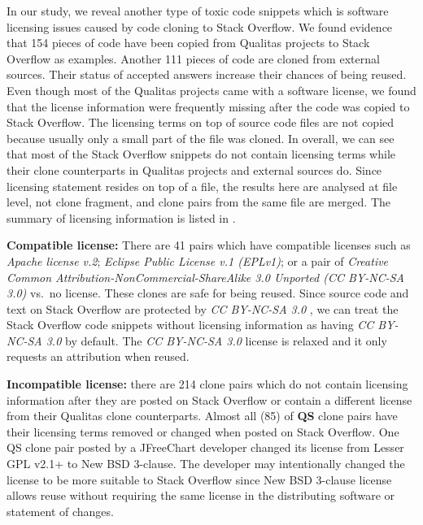 \documentclass[10pt,journal,compsoc]{IEEEtran}
\begin{document}
In our study, we reveal another type of toxic code snippets which is software
licensing issues caused by code cloning to Stack Overflow. We found evidence that
154 pieces of code have been copied from Qualitas projects to Stack Overflow as
examples. Another 111 pieces of code are cloned from external sources. Their
status of accepted answers increase their chances of being reused. Even though
most of the Qualitas projects came with a software license, we found that the
license information were frequently missing after the code was copied to Stack
Overflow. The licensing terms on top of source code files are not copied because
usually only a small part of the file was cloned. In overall, we can see that
most of the Stack Overflow snippets do not contain licensing terms while their
clone counterparts in Qualitas projects and external sources do. Since licensing
statement resides on top of a file, the results here are analysed at file level,
not clone fragment, and clone pairs from the same file are merged. 
The summary of licensing information is listed in
.

\textbf{Compatible license:} There are 41 pairs which have compatible
licenses such as \emph{Apache license v.2}; \emph{Eclipse Public
	License v.1 (EPLv1)}; or a pair of \emph{Creative
	Common Attribution-NonCommercial-ShareAlike 3.0 Unported (CC
	BY-NC-SA 3.0)} vs.~no license. These clones are safe for being reused. Since source
code and text on Stack Overflow are
protected by \emph{CC BY-NC-SA 3.0}
, we can treat the Stack Overflow code snippets
without licensing information as having \emph{CC BY-NC-SA 3.0} by
default. The \emph{CC BY-NC-SA 3.0} license is relaxed and it only
requests an attribution when reused.

\textbf{Incompatible license:} there are 214 clone pairs which do not contain
licensing information after they are posted on Stack Overflow or contain a
different license from their Qualitas clone counterparts. Almost all (85) of
\textbf{QS} clone pairs have their licensing terms removed or changed when
posted on Stack Overflow. One QS clone pair posted by a JFreeChart developer
changed its license from Lesser GPL v2.1+ to New BSD 3-clause. The
developer may intentionally changed the license to be more suitable to Stack
Overflow since New BSD 3-clause license allows reuse without requiring the same
license in the distributing software or statement of changes. 
\end{document}
